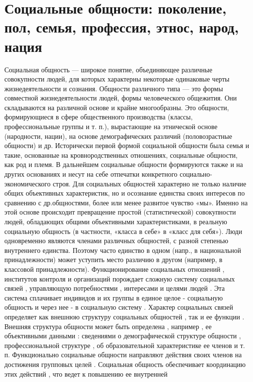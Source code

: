 \documentclass[12pt]{article}
\begin{document}
\section{Социальные общности: поколение, пол, семья, профессия, этнос, народ, нация}
Социальная  общность  —  широкое  понятие,  объединяющее  различные  совокупности  людей,  для  которых
характерны некоторые одинаковые черты жизнедеятельности и сознания.
Общности  различного  типа  —  это  формы  совместной  жизнедеятельности  людей,  формы  человеческого
общежития. Они складываются на различной основе и крайне многообразны. Это общности, формирующиеся в
сфере общественного производства (классы, профессиональные группы и т. п.), вырастающие на этнической
основе (народности, нации), на основе демографических различий (половозрастные общности) и др.
Исторически первой формой социальной общности была семья и такие, основанные на кровнородственных
отношениях, социальные общности, как род и племя. В дальнейшем социальные общности формируются также
и на других основаниях и несут на себе отпечатки конкретного социально-экономического строя.
Для социальных общностей характерно не только наличие общих объективных характеристик, но и осознание
единства своих интересов по сравнению с др.общностями, более или менее развитое чувство «мы». Именно на
этой основе происходит превращение простой (статистической) совокупности людей, обладающих общими
объективными характеристиками, в реальную социальную общность (в частности, «класса в себе» в «класс для
себя»).
Люди  одновременно  являются  членами  различных  общностей,  с  разной  степенью  внутреннего  единства.
Поэтому часто единство в одном (напр., в национальной принадлежности) может уступить место различию в
другом (например, в классовой принадлежности).
Функционирование социальных отношений , институтов контроля и организаций порождает сложную систему
социальных связей , управляющую потребностями , интересами и целями людей . Эта система сплачивает 
индивидов и их группы в единое целое - социальную общность и через нее - в социальную систему . Характер
социальных связей определяет как внешнюю структуру социальных общностей , так и ее функции . Внешняя
структура  общности  может  быть  определена  ,  например  ,  ее  объективными  данными  :  сведениями  о
демографической структуре общности , профессиональной структуре , об образовательной характеристике ее
членов и т. п.
Функционально социальные общности направляют действия своих членов на достижения групповых целей .
Социальная  общность  обеспечивает  координацию  этих  действий  ,  что  ведет  к  повышению  ее  внутренней
\end{document}
